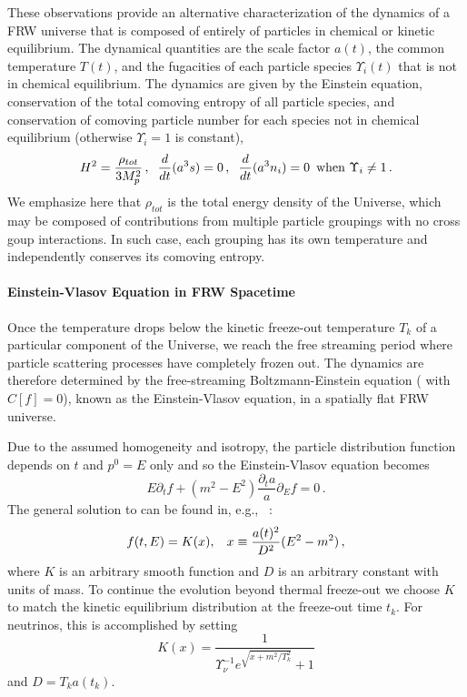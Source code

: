 These observations provide an alternative characterization of the dynamics of a FRW universe that is composed of entirely of particles in chemical or kinetic equilibrium.  The dynamical quantities are the scale factor $a(t)$, the common temperature $T(t)$, and the fugacities of each particle species $\Upsilon_i(t)$ that is not in chemical equilibrium.  The dynamics are given by the Einstein equation, conservation of the total comoving entropy of all particle species, and conservation of comoving particle number for each species not in chemical equilibrium (otherwise $\Upsilon_i=1$ is constant),
\begin{equation}\label{eq_dynamics}
H^2=\frac{\rho_{tot}}{3M_p^2}\,, \hspace{2mm} \frac{d}{dt}(a^3s)=0\,,\hspace{2mm} \frac{d}{dt}(a^3n_i)=0 \,\text{ when } \Upsilon_i\neq 1\,.
\end{equation}
We emphasize here that $\rho_{tot}$ is the total energy density of the Universe, which may be composed of contributions from multiple particle groupings with no cross goup interactions. In such case, each grouping has its own temperature and   independently conserves its comoving entropy. 


\paragraph{Einstein-Vlasov Equation in FRW Spacetime}
Once the temperature drops below the kinetic freeze-out temperature $T_k$ of a particular component of the Universe, we reach  the free streaming period where  particle scattering processes have completely frozen out. The   dynamics are therefore determined by the free-streaming Boltzmann-Einstein equation ( with $C[f]=0$), known as the Einstein-Vlasov equation, in a spatially flat FRW universe.  

Due to the assumed homogeneity and isotropy, the particle distribution function depends on $t$ and $p^0=E$ only and so the Einstein-Vlasov equation becomes
\begin{equation}\label{VEeqFLR}
E\partial_tf+(m^2-E^2)\frac{\partial_ta}{a}\partial_{E}f=0\,.
\end{equation}
The general solution to  can be found in, e.g., ~\cite{Choquet-Bruhat:2009xil,Wong:2011ip}:
\begin{equation}\label{general_sol}
f(t,E)=K(x),\hspace{3mm} x\equiv\frac{a(t)^2}{D^2}(E^2-m^2)\,,
\end{equation}
where $K$ is an arbitrary smooth function and $D$ is an arbitrary constant with units of mass.  To continue the evolution beyond thermal freeze-out  we choose $K$ to match the kinetic equilibrium distribution  at the freeze-out time $t_k$. For neutrinos, this is accomplished by setting
\begin{equation}\label{K_func}
K(x)=\frac{1}{\Upsilon_\nu^{-1}e^{\sqrt{x+m^2/T_k^2}}+ 1}
\end{equation}
and $D=T_k a(t_k)$. 

